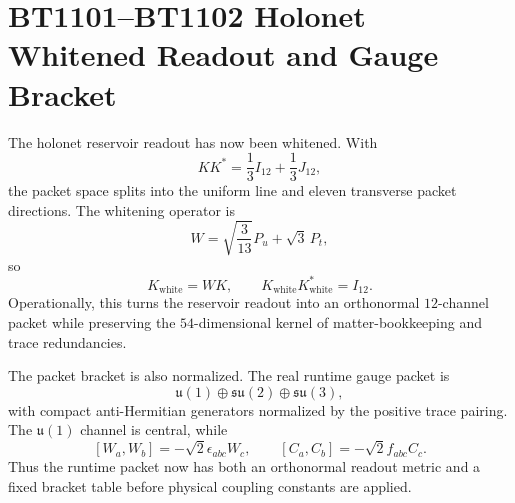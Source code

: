 \section{BT1101--BT1102 Holonet Whitened Readout and Gauge Bracket}
\label{sec:bt1101-bt1102-holonet-whitening-structure}

The holonet reservoir readout has now been whitened.  With
\[
KK^*=\frac13 I_{12}+\frac13J_{12},
\]
the packet space splits into the uniform line and eleven transverse packet directions.  The whitening operator is
\[
W=\sqrt{\frac3{13}}P_u+\sqrt3\,P_t,
\]
so
\[
K_{\mathrm{white}}=WK,
\qquad
K_{\mathrm{white}}K_{\mathrm{white}}^*=I_{12}.
\]
Operationally, this turns the reservoir readout into an orthonormal $12$-channel packet while preserving the $54$-dimensional kernel of matter-bookkeeping and trace redundancies.

The packet bracket is also normalized.  The real runtime gauge packet is
\[
\mathfrak u(1)\oplus\mathfrak{su}(2)\oplus\mathfrak{su}(3),
\]
with compact anti-Hermitian generators normalized by the positive trace pairing.  The $\mathfrak u(1)$ channel is central, while
\[
[W_a,W_b]=-\sqrt2\epsilon_{abc}W_c,
\qquad
[C_a,C_b]=-\sqrt2f_{abc}C_c.
\]
Thus the runtime packet now has both an orthonormal readout metric and a fixed bracket table before physical coupling constants are applied.
